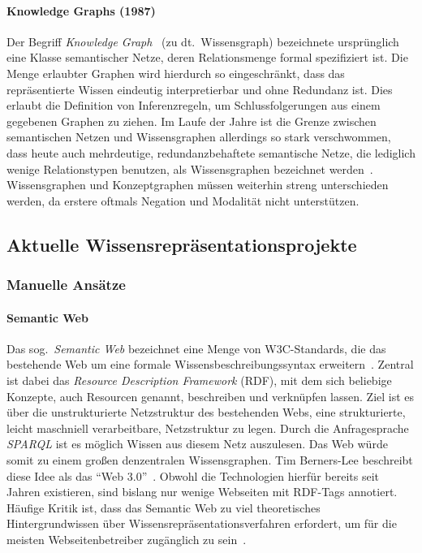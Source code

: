 \paragraph{Knowledge Graphs (1987)}
Der Begriff \textit{Knowledge Graph}~\cite{Riet1992} (zu dt.~Wissensgraph) bezeichnete ursprünglich eine Klasse semantischer Netze, deren Relationsmenge formal spezifiziert ist.
Die Menge erlaubter Graphen wird hierdurch so eingeschränkt, dass das repräsentierte Wissen eindeutig interpretierbar und ohne Redundanz ist.
Dies erlaubt die Definition von Inferenzregeln, um Schlussfolgerungen aus einem gegebenen Graphen zu ziehen.
Im Laufe der Jahre ist die Grenze zwischen semantischen Netzen und Wissensgraphen allerdings so stark verschwommen, dass heute auch mehrdeutige, redundanzbehaftete semantische Netze, die lediglich wenige Relationstypen benutzen, als Wissensgraphen bezeichnet werden~\cite{McCusker2016}.
Wissensgraphen und Konzeptgraphen müssen weiterhin streng unterschieden werden, da erstere oftmals Negation und Modalität nicht unterstützen.

\subsection{Aktuelle Wissensrepräsentationsprojekte}%
\label{sec:related:kr:today}

\subsubsection{Manuelle Ansätze}

\paragraph{Semantic Web}
Das sog.~\textit{Semantic Web} bezeichnet eine Menge von W3C-Standards, die das bestehende Web um eine formale Wissensbeschreibungssyntax erweitern~\cite{SemWeb}.
Zentral ist dabei das \textit{Resource Description Framework} (RDF), mit dem sich beliebige Konzepte, auch Resourcen genannt, beschreiben und verknüpfen lassen.
Ziel ist es über die unstrukturierte Netzstruktur des bestehenden Webs, eine strukturierte, leicht maschniell verarbeitbare, Netzstruktur zu legen.
Durch die Anfragesprache \textit{SPARQL} ist es möglich Wissen aus diesem Netz auszulesen.
Das Web würde somit zu einem großen denzentralen Wissensgraphen.
Tim Berners-Lee beschreibt diese Idee als das ``Web 3.0''~\cite{Shannon2006}.
Obwohl die Technologien hierfür bereits seit Jahren existieren, sind bislang nur wenige Webseiten mit RDF-Tags annotiert.
Häufige Kritik ist, dass das Semantic Web zu viel theoretisches Hintergrundwissen über Wissensrepräsentationsverfahren erfordert, um für die meisten Webseitenbetreiber zugänglich zu sein~\cite{Marshall2003}.

